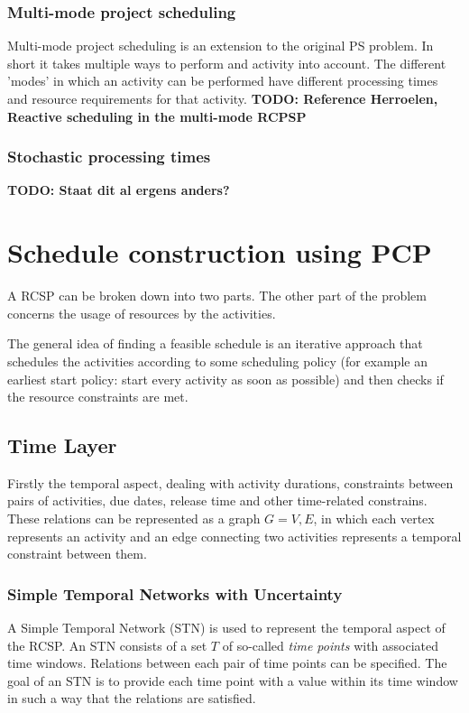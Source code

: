 \documentclass{article}
\newcommand{\TODO}[1]{{\color{red}\textbf{TODO: #1}}}
\begin{document}
\subsubsection{Multi-mode project scheduling}
Multi-mode project scheduling is an extension to the original PS problem. In short it takes multiple ways to perform and activity into account. The different 'modes' in which an activity can be performed have different processing times and resource requirements for that activity. 
\TODO{Reference Herroelen, Reactive scheduling in the multi-mode RCPSP}

\subsubsection{Stochastic processing times}
\TODO{Staat dit al ergens anders?}




\section{Schedule construction using PCP}
A RCSP can be broken down into two parts.  The other part of the problem concerns the usage of resources by the activities. 

The general idea of finding a feasible schedule is an iterative approach that schedules the activities according to some scheduling policy (for example an earliest start policy: start every activity as soon as possible) and then checks if the resource constraints are met. 

\subsection{Time Layer}
Firstly the temporal aspect, dealing with activity durations, constraints between pairs of activities, due dates, release time and other time-related constrains. These relations can be represented as a graph $G={V,E}$, in which each vertex represents an activity and an edge connecting two activities represents a temporal constraint between them.

\subsubsection{Simple Temporal Networks with Uncertainty}
A Simple Temporal Network (STN) is used to represent the temporal aspect of the RCSP. An STN consists of a set $T$ of so-called \emph{time points} with associated time windows. Relations between each pair of time points can be specified. The goal of an STN is to provide each time point with a value within its time window in such a way that the relations are satisfied. 
\end{document}

